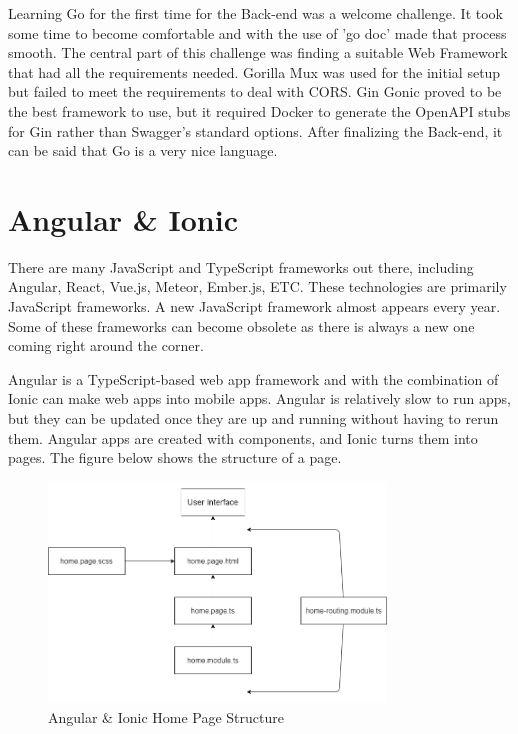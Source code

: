 Learning Go for the first time for the Back-end was a welcome challenge. It took some time to become comfortable and with the use of 'go doc' made that process smooth. The central part of this challenge was finding a suitable Web Framework that had all the requirements needed. Gorilla Mux was used for the initial setup but failed to meet the requirements to deal with CORS.
Gin Gonic proved to be the best framework to use, but it required Docker to generate the OpenAPI stubs for Gin rather than Swagger's standard options. After finalizing the Back-end, it can be said that Go is a very nice language. 
 
\section{Angular \& Ionic}
There are many JavaScript and TypeScript frameworks out there, including Angular, React, Vue.js, Meteor, Ember.js, ETC. These technologies are primarily JavaScript frameworks. A new JavaScript framework almost appears every year. Some of these frameworks can become obsolete as there is always a new one coming right around the corner.

Angular is a TypeScript-based web app framework and with the combination of Ionic can make web apps into mobile apps. Angular is relatively slow to run apps, but they can be updated once they are up and running without having to rerun them. Angular apps are created with components, and Ionic turns them into pages. The figure below shows the structure of a page.

\begin{figure}[H]
    \caption{Angular \& Ionic Home Page Structure}
    \label{image:ngHomePage}
    \centering
    \includegraphics[width=0.8\textwidth]{images/misc/ng-homepage.png}
\end{figure}


